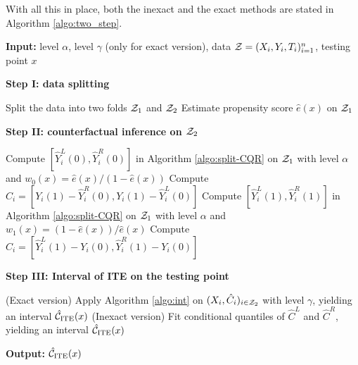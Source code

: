 With all this in place, both the inexact and the exact methods are stated in
Algorithm \ref{algo:two_step}.
\begin{algorithm}
  \caption{Nested approach for interval estimates of ITE}  \label{algo:two_step}
  \textbf{Input: } level $\alpha$, level $\gamma$ (only for exact version), data $\mathcal{Z} = (X_{i}, Y_{i}, T_{i})_{i=1}^{n}$, testing point $x$

  \vspace{0.2cm}
  \textbf{Step I: data splitting}
  \begin{algorithmic}[1]
    \State Split the data into two folds $\mathcal{Z}_{1}$ and $\mathcal{Z}_{2}$
    \State Estimate propensity score $\hat{e}(x)$ on $\mathcal{Z}_{1}$
  \end{algorithmic}

  \vspace{0.2cm}
  \textbf{Step II: counterfactual inference on $\mathcal{Z}_{2}$}
  \begin{algorithmic}[1]   
         \State Compute $[\hat{Y}_{i}^{L}(0), \hat{Y}_{i}^{R}(0)]$ in Algorithm \ref{algo:split-CQR} on $\mathcal{Z}_{1}$ with level $\alpha$ and $w_{0}(x) = \hat{e}(x) / (1 - \hat{e}(x))$
         \State Compute $\hat{C}_{i} = [Y_{i}(1) - \hat{Y}_{i}^{R}(0), Y_{i}(1) - \hat{Y}_{i}^{L}(0)]$
    \EndFor
         \State Compute $[\hat{Y}_{i}^{L}(1), \hat{Y}_{i}^{R}(1)]$ in Algorithm \ref{algo:split-CQR} on $\mathcal{Z}_{1}$ with level $\alpha$ and $w_{1}(x) = (1 - \hat{e}(x)) / \hat{e}(x)$
         \State Compute $\hat{C}_{i} = [\hat{Y}_{i}^{L}(1) - Y_{i}(0), \hat{Y}_{i}^{R}(1) - Y_{i}(0)]$
    \EndFor
  \end{algorithmic}

  \vspace{0.2cm}
  \textbf{Step III: Interval of ITE on the testing point}
  \begin{algorithmic}[1]
    \State (Exact version) Apply Algorithm \ref{algo:int} on $(X_{i}, \hat{C}_{i})_{i\in \mathcal{Z}_{2}}$ with level $\gamma$, yielding an interval $\hat{\mathcal{C}}_\text{ITE}(x)$
    \State (Inexact version) Fit conditional quantiles of $\hat{C}^{L}$ and $\hat{C}^{R}$, yielding an interval $\hat{\mathcal{C}}_\text{ITE}(x)$
  \end{algorithmic}
  \textbf{Output: $\hat{\mathcal{C}}_\text{ITE}(x)$}\label{algo:nest_CQR}
\end{algorithm}


